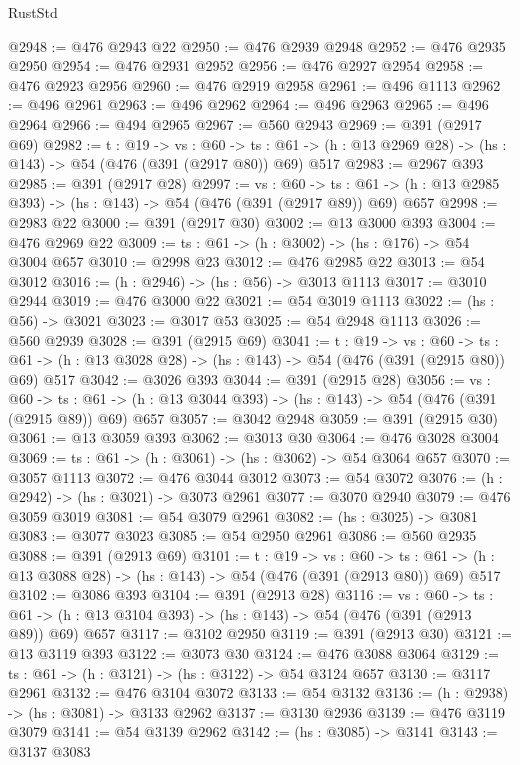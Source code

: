 \begin{lexlean}{RustStd}
\begin{coremodule}
@2948 := @476 @2943 @22
@2950 := @476 @2939 @2948
@2952 := @476 @2935 @2950
@2954 := @476 @2931 @2952
@2956 := @476 @2927 @2954
@2958 := @476 @2923 @2956
@2960 := @476 @2919 @2958
@2961 := @496 @1113
@2962 := @496 @2961
@2963 := @496 @2962
@2964 := @496 @2963
@2965 := @496 @2964
@2966 := @494 @2965
@2967 := @560 @2943
@2969 := @391 (@2917 @69)
@2982 := {t : @19} ->
  {vs : @60} ->
  {ts : @61} -> (h : @13 @2969 @28) -> (hs : @143) -> @54 (@476 (@391 (@2917 @80)) @69) @517
@2983 := @2967 @393
@2985 := @391 (@2917 @28)
@2997 := {vs : @60} ->
  {ts : @61} -> (h : @13 @2985 @393) -> (hs : @143) -> @54 (@476 (@391 (@2917 @89)) @69) @657
@2998 := @2983 @22
@3000 := @391 (@2917 @30)
@3002 := @13 @3000 @393
@3004 := @476 @2969 @22
@3009 := {ts : @61} -> (h : @3002) -> (hs : @176) -> @54 @3004 @657
@3010 := @2998 @23
@3012 := @476 @2985 @22
@3013 := @54 @3012
@3016 := (h : @2946) -> (hs : @56) -> @3013 @1113
@3017 := @3010 @2944
@3019 := @476 @3000 @22
@3021 := @54 @3019 @1113
@3022 := (hs : @56) -> @3021
@3023 := @3017 @53
@3025 := @54 @2948 @1113
@3026 := @560 @2939
@3028 := @391 (@2915 @69)
@3041 := {t : @19} ->
  {vs : @60} ->
  {ts : @61} -> (h : @13 @3028 @28) -> (hs : @143) -> @54 (@476 (@391 (@2915 @80)) @69) @517
@3042 := @3026 @393
@3044 := @391 (@2915 @28)
@3056 := {vs : @60} ->
  {ts : @61} -> (h : @13 @3044 @393) -> (hs : @143) -> @54 (@476 (@391 (@2915 @89)) @69) @657
@3057 := @3042 @2948
@3059 := @391 (@2915 @30)
@3061 := @13 @3059 @393
@3062 := @3013 @30
@3064 := @476 @3028 @3004
@3069 := {ts : @61} -> (h : @3061) -> (hs : @3062) -> @54 @3064 @657
@3070 := @3057 @1113
@3072 := @476 @3044 @3012
@3073 := @54 @3072
@3076 := (h : @2942) -> (hs : @3021) -> @3073 @2961
@3077 := @3070 @2940
@3079 := @476 @3059 @3019
@3081 := @54 @3079 @2961
@3082 := (hs : @3025) -> @3081
@3083 := @3077 @3023
@3085 := @54 @2950 @2961
@3086 := @560 @2935
@3088 := @391 (@2913 @69)
@3101 := {t : @19} ->
  {vs : @60} ->
  {ts : @61} -> (h : @13 @3088 @28) -> (hs : @143) -> @54 (@476 (@391 (@2913 @80)) @69) @517
@3102 := @3086 @393
@3104 := @391 (@2913 @28)
@3116 := {vs : @60} ->
  {ts : @61} -> (h : @13 @3104 @393) -> (hs : @143) -> @54 (@476 (@391 (@2913 @89)) @69) @657
@3117 := @3102 @2950
@3119 := @391 (@2913 @30)
@3121 := @13 @3119 @393
@3122 := @3073 @30
@3124 := @476 @3088 @3064
@3129 := {ts : @61} -> (h : @3121) -> (hs : @3122) -> @54 @3124 @657
@3130 := @3117 @2961
@3132 := @476 @3104 @3072
@3133 := @54 @3132
@3136 := (h : @2938) -> (hs : @3081) -> @3133 @2962
@3137 := @3130 @2936
@3139 := @476 @3119 @3079
@3141 := @54 @3139 @2962
@3142 := (hs : @3085) -> @3141
@3143 := @3137 @3083

\end{coremodule}
\end{lexlean}
